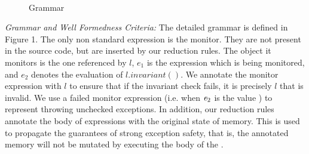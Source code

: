\begin{figure}
\begin{grammatica}
\\
\\
\\
\\
\\
\\
\end{grammatica}
\caption{Grammar}
\end{figure}


\loseSpace
\noindent\textit{Grammar and Well Formedness Criteria:}
The detailed grammar is defined in Figure 1.
The only non standard expression is the monitor. They are not present in the source code, but are inserted by our reduction rules. The object it monitors is the one referenced by $l$, $e_1$ is the expression which is being monitored, and $e_2$ denotes the evaluation of $l.invariant()$.
We annotate the monitor expression with $l$ to ensure
that if the invariant check fails, it is precisely $l$ that is invalid.
We use a failed monitor expression (i.e. when ${\mathit{e}}_2$ is the value \Q@false@) to represent throwing unchecked exceptions.
In addition, our reduction rules annotate the body of \Q@try@ expressions with
the original state of memory. This is used to propagate the guarantees of strong exception safety,
that is, the annotated memory will not be mutated by executing the body of the \Q@try@.

